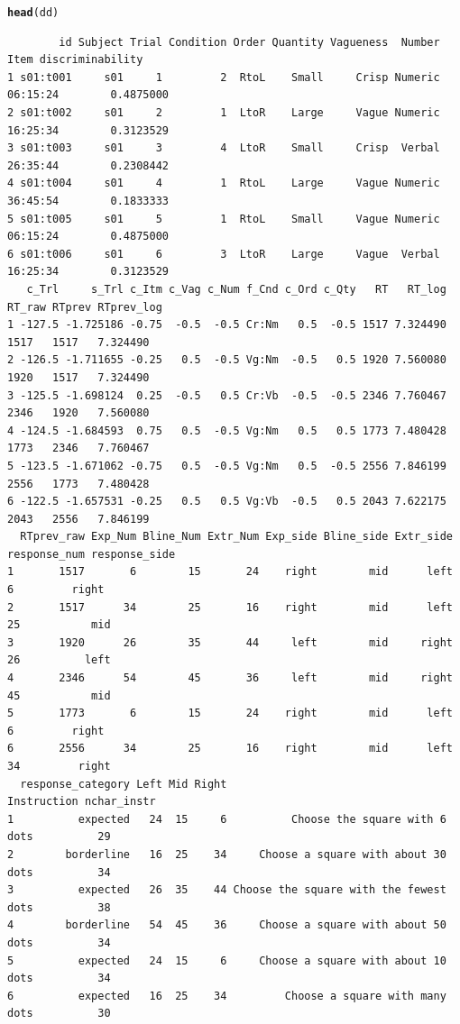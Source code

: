 \documentclass[a4paper,12pt,twoside]{article}\usepackage[]{graphicx}\usepackage[]{color}
\makeatletter
\newcommand{\hlstd}[1]{\textcolor[rgb]{0.345,0.345,0.345}{#1}}%
\newcommand{\hlkwd}[1]{\textcolor[rgb]{0.737,0.353,0.396}{\textbf{#1}}}%
\newenvironment{kframe}{%
 \def\at@end@of@kframe{}%
 \ifinner\ifhmode%
  \def\at@end@of@kframe{\end{minipage}}%
  \begin{minipage}{\columnwidth}%
 \fi\fi%
 \def\FrameCommand##1{\hskip\@totalleftmargin \hskip-\fboxsep
 \colorbox{shadecolor}{##1}\hskip-\fboxsep
     \hskip-\linewidth \hskip-\@totalleftmargin \hskip\columnwidth}%
 \MakeFramed {\advance\hsize-\width
   \@totalleftmargin\z@ \linewidth\hsize
   \@setminipage}}%
 {\par\unskip\endMakeFramed%
 \at@end@of@kframe}
\newenvironment{knitrout}{}{} %
\makeatother
\begin{document}
\begin{knitrout}\scriptsize
{}\color{fgcolor}\begin{kframe}
\begin{alltt}
\hlkwd{head}\hlstd{(dd)}
\end{alltt}
\begin{verbatim}
        id Subject Trial Condition Order Quantity Vagueness  Number     Item discriminability
1 s01:t001     s01     1         2  RtoL    Small     Crisp Numeric 06:15:24        0.4875000
2 s01:t002     s01     2         1  LtoR    Large     Vague Numeric 16:25:34        0.3123529
3 s01:t003     s01     3         4  LtoR    Small     Crisp  Verbal 26:35:44        0.2308442
4 s01:t004     s01     4         1  RtoL    Large     Vague Numeric 36:45:54        0.1833333
5 s01:t005     s01     5         1  RtoL    Small     Vague Numeric 06:15:24        0.4875000
6 s01:t006     s01     6         3  LtoR    Large     Vague  Verbal 16:25:34        0.3123529
   c_Trl     s_Trl c_Itm c_Vag c_Num f_Cnd c_Ord c_Qty   RT   RT_log RT_raw RTprev RTprev_log
1 -127.5 -1.725186 -0.75  -0.5  -0.5 Cr:Nm   0.5  -0.5 1517 7.324490   1517   1517   7.324490
2 -126.5 -1.711655 -0.25   0.5  -0.5 Vg:Nm  -0.5   0.5 1920 7.560080   1920   1517   7.324490
3 -125.5 -1.698124  0.25  -0.5   0.5 Cr:Vb  -0.5  -0.5 2346 7.760467   2346   1920   7.560080
4 -124.5 -1.684593  0.75   0.5  -0.5 Vg:Nm   0.5   0.5 1773 7.480428   1773   2346   7.760467
5 -123.5 -1.671062 -0.75   0.5  -0.5 Vg:Nm   0.5  -0.5 2556 7.846199   2556   1773   7.480428
6 -122.5 -1.657531 -0.25   0.5   0.5 Vg:Vb  -0.5   0.5 2043 7.622175   2043   2556   7.846199
  RTprev_raw Exp_Num Bline_Num Extr_Num Exp_side Bline_side Extr_side response_num response_side
1       1517       6        15       24    right        mid      left            6         right
2       1517      34        25       16    right        mid      left           25           mid
3       1920      26        35       44     left        mid     right           26          left
4       2346      54        45       36     left        mid     right           45           mid
5       1773       6        15       24    right        mid      left            6         right
6       2556      34        25       16    right        mid      left           34         right
  response_category Left Mid Right                            Instruction nchar_instr
1          expected   24  15     6          Choose the square with 6 dots          29
2        borderline   16  25    34     Choose a square with about 30 dots          34
3          expected   26  35    44 Choose the square with the fewest dots          38
4        borderline   54  45    36     Choose a square with about 50 dots          34
5          expected   24  15     6     Choose a square with about 10 dots          34
6          expected   16  25    34         Choose a square with many dots          30
\end{verbatim}
\end{kframe}
\end{knitrout}
\end{document}
